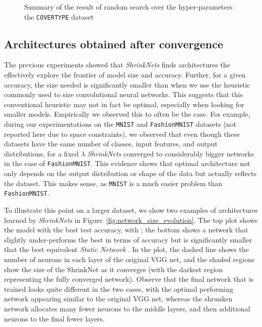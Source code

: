 \begin{figure}[t]
\begin{minipage}{2.7in}
\begin{center}
\vspace*{-5mm}
\caption{\label{figure_COVER} Summary of the result of random
search over the hyper-parameters the \texttt{COVERTYPE} dataset
}
\end{center}
\vspace*{-4mm}
\end{minipage}
\end{figure}


\subsection{Architectures obtained after convergence}

The previous experiments showed that \textit{ShrinkNets} finds architectures
the effectively explore the frontier of model size and accuracy. Further, for
a  given accuracy,
the size needed is significantly smaller than when we use the  heuristic
 commonly used to size convolutional neural networks. This suggests that this
 conventional heuristic may not in fact be optimal, especially when looking for 
 smaller models. 
Empirically we observed this to often be the case.  For example, 
during our experimentations on the \texttt{MNIST}
\cite{Lecun1998} and \texttt{FashionMNIST} \cite{Xiao2017} datasets (not reported here due to space constraints), we observed that
even though these datasets have the same number of classes, input features, and output
distributions,  for a fixed $\lambda$ \textit{ShrinkNets} converged to
considerably bigger networks in the case of \texttt{FashionMNIST}. This
evidence shows that optimal architecture not only depends on the output
distribution or shape of the data but actually reflects the dataset.  This makes sense,
as  \texttt{MNIST} is a much easier problem than \texttt{FashionMNIST}.

To illustrate this point on a larger dataset, 
we show two examples of architectures learned by \textit{ShrinkNets} in Figure~\ref{fig:network_size_evolution}.  The top plot shows the model with the best
 test accuracy, with ; 
 the bottom shows a network that slightly under-performs the best in terms of accuracy but is
significantly smaller that the best equivalent \textit{Static Network} .
In the plot, the dashed line shows the number of neurons in each layer of the original VGG net, and the shaded regions show the size of the ShrinkNet as it converges (with the darkest region representing the fully converged network).  Observe that the final network that is trained looks quite different in the two cases, with the optimal performing network appearing similar to the original VGG net, whereas the shrunken network allocates many fewer neurons to the middle layers, and then additional neurons to the final fewer layers.

